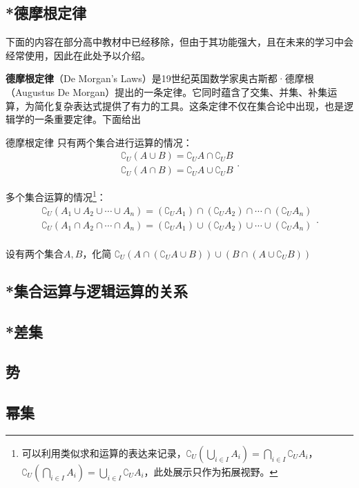 \subsection{*德摩根定律}

下面的内容在部分高中教材中已经移除，但由于其功能强大，且在未来的学习中会经常使用，因此在此处予以介绍。

\textbf{德摩根定律}（De Morgan’s Laws）是19世纪英国数学家奥古斯都·德摩根（Augustus De Morgan）提出的一条定律。它同时蕴含了交集、并集、补集运算，为简化复杂表达式提供了有力的工具。这条定律不仅在集合论中出现，也是逻辑学的一条重要定律。下面给出

\begin{theorem}{德摩根定律}
只有两个集合进行运算的情况：
\begin{equation}
\begin{array}{c} 
\complement_U(A \cup B) = \complement_U A \cap \complement_U B \\  
\complement_U(A \cap B) = \complement_U A \cup \complement_U B
\end{array}.~
\end{equation}

多个集合运算的情况\footnote{可以利用类似求和运算的表达来记录，$\displaystyle\complement_U(\bigcup_{i\in I} A_i)=\bigcap_{i\in I} {\complement_UA_i}$，$\displaystyle\complement_U(\bigcap_{i\in I} A_i)=\bigcup_{i\in I} {\complement_UA_i}$，此处展示只作为拓展视野。}：
\begin{equation}
\begin{array}{c} 
\displaystyle
\complement_U(A_1\cup A_2\cup\cdots\cup A_n)=(\complement_UA_1)\cap (\complement_UA_2)\cap\cdots\cap(\complement_UA_n)\\  
\displaystyle
\complement_U(A_1\cap A_2\cap\cdots\cap A_n)=(\complement_UA_1)\cup (\complement_UA_2)\cup\cdots\cup(\complement_UA_n)\\  
\end{array}.~
\end{equation}
\end{theorem}
\begin{example}{设有两个集合$A,B$，化简 $\complement_U(A \cap (\complement_UA \cup B)) \cup (B \cap (A \cup \complement_UB))$  }


\end{example}



\subsection{*集合运算与逻辑运算的关系}



\subsection{*差集}
\subsection{势}
\subsection{幂集}

